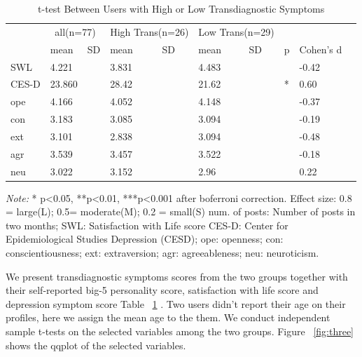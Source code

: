 \begin{table}%
\caption{t-test Between Users with High or Low Transdiagnostic Symptoms}
\label{tab:two}
\begin{minipage}{\columnwidth}
\begin{center}
\begin{tabular}{llllllllll}
  \toprule
        & \multicolumn{2}{c}{all(n=77)}	& \multicolumn{2}{c}{High Trans(n=26)}   & \multicolumn{2}{c}{Low Trans(n=29)} &  &  \\ 
   &  mean  & SD &  mean & SD &  mean & SD & p & Cohen's d \\     

  \hline\hline
  SWL  & 4.221 &  & 3.831 &  &4.483 &  &  & -0.42 \\
  CES-D  & 23.860 &  & 28.42 &  &21.62 &  & * & 0.60 \\
  ope  & 4.166 &  & 4.052 &  &4.148 &  &  &-0.37 \\
  con  & 3.183 &  & 3.085 &  &3.094 &  &  & -0.19\\
  ext  & 3.101 &  & 2.838 &  &3.094 &  &  & -0.48 \\
  agr  & 3.539 &  & 3.457 &  &3.522 &  &  &-0.18 \\
  neu  & 3.022 &  & 3.152 &  &2.96 &  &  & 0.22 \\

\bottomrule
\end{tabular}
\end{center}
\bigskip\centering

 \emph{Note:} * p<0.05, **p<0.01, ***p<0.001 after boferroni correction. Effect size: 0.8 = large(L);  0.5= moderate(M); 0.2 = small(S)
num. of posts: Number of posts in two months;  SWL: Satisfaction with Life score
CES-D: Center for Epidemiological Studies Depression (CESD); ope: openness; con: conscientiousness; ext: extraversion; agr: agreeableness;  neu: neuroticism. 

\end{minipage}
\end{table}%

We present transdiagnostic symptoms scores from the two groups together with their self-reported big-5 personality score, satisfaction with life score and depression symptom score Table ~\ref{tab:two} . Two users didn’t report their age on their profiles, here we assign the mean age to the them. We conduct independent sample t-tests on the selected variables among the two groups. Figure ~\ref{fig:three} shows the qqplot of the selected variables. 


